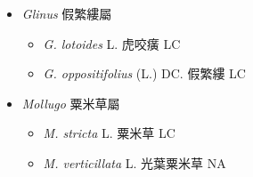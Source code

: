 
  \begin{itemize}
 \item[] \textit{Glinus} 假繁縷屬
                                
  \begin{itemize}
        \item[] \textit{G. lotoides} L.  虎咬癀   LC
        \item[] \textit{G. oppositifolius} (L.) DC.  假繁縷   LC
  \end{itemize}
 \item[] \textit{Mollugo} 粟米草屬
                                
  \begin{itemize}
        \item[] \textit{M. stricta} L.  粟米草   LC
        \item[] \textit{M. verticillata} L.  光葉粟米草   NA
  \end{itemize}
  \end{itemize}
